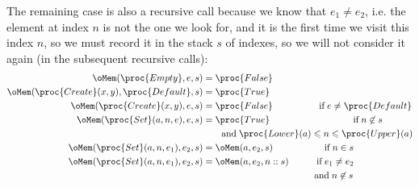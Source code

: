 \begin{itemize}
    The remaining case is also a recursive call because we know that
    \(e_1 \neq e_2\), i.e. the element at index \(n\) is not the one
    we look for, and it is the first time we visit this index \(n\),
    so we must record it in the stack \(s\) of indexes, so we will not
    consider it again (in the subsequent recursive calls):
    \begin{align*}
        \oMem (\proc{Empty}, e, s)
     &= \proc{False}\\
        \oMem (\proc{Create} (x, y), \proc{Default}, s)
     &= \proc{True}\\
        \oMem (\proc{Create} (x, y), e, s)
     &= \proc{False}
        \qquad\qquad\quad \text{if} \; e \neq \proc{Default}\\
        \oMem (\proc{Set} (a, n, e), e, s)
     &= \proc{True}
       \qquad\qquad\qquad\qquad\quad \text{if} \; n \not\in s\\
     & \qquad \text{and} \; \proc{Lower} (a)
        \leqslant n \leqslant \proc{Upper} (a)\\
        \oMem (\proc{Set} (a, n, e_1), e_2, s)
     &= \oMem (a, e_2, s)
        \qquad\qquad\quad \;\; \text{if} \; n \in s\\
        \oMem (\proc{Set} (a, n, e_1), e_2, s)
     &= \oMem (a, e_2, n :: s) \qquad\quad \text{if} \; e_1 \neq e_2\\
     &  \qquad\qquad\qquad\qquad\qquad\qquad  \text{and} \; n \not\in s
    \end{align*}
  

\end{itemize}
